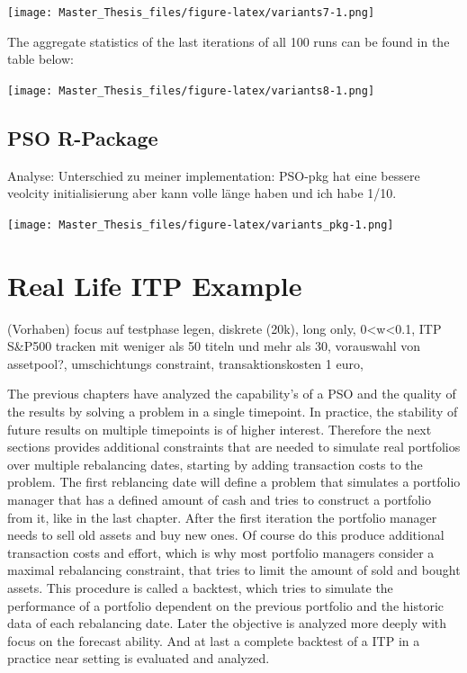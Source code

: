 \documentclass[
  oneside]{book}
\begin{document}
\texttt{[image: Master\_Thesis\_files/figure-latex/variants7-1.png]}

The aggregate statistics of the last iterations of all 100 runs can be found in the table below:

\texttt{[image: Master\_Thesis\_files/figure-latex/variants8-1.png]}

\hypertarget{pso-r-package}{%
\section{PSO R-Package}\label{pso-r-package}}

Analyse:
Unterschied zu meiner implementation:
PSO-pkg hat eine bessere veolcity initialisierung aber kann volle länge haben und ich habe 1/10.

\texttt{[image: Master\_Thesis\_files/figure-latex/variants\_pkg-1.png]}

\hypertarget{real-life-itp-example}{%
\chapter{Real Life ITP Example}\label{real-life-itp-example}}

(Vorhaben)
focus auf testphase legen, diskrete (20k), long only, 0\textless w\textless0.1, ITP S\&P500 tracken mit weniger als 50 titeln und mehr als 30, vorauswahl von assetpool?, umschichtungs constraint, transaktionskosten 1 euro,

The previous chapters have analyzed the capability's of a PSO and the quality of the results by solving a problem in a single timepoint. In practice, the stability of future results on multiple timepoints is of higher interest. Therefore the next sections provides additional constraints that are needed to simulate real portfolios over multiple rebalancing dates, starting by adding transaction costs to the problem. The first reblancing date will define a problem that simulates a portfolio manager that has a defined amount of cash and tries to construct a portfolio from it, like in the last chapter. After the first iteration the portfolio manager needs to sell old assets and buy new ones. Of course do this produce additional transaction costs and effort, which is why most portfolio managers consider a maximal rebalancing constraint, that tries to limit the amount of sold and bought assets. This procedure is called a backtest, which tries to simulate the performance of a portfolio dependent on the previous portfolio and the historic data of each rebalancing date. Later the objective is analyzed more deeply with focus on the forecast ability. And at last a complete backtest of a ITP in a practice near setting is evaluated and analyzed.
\end{document}
